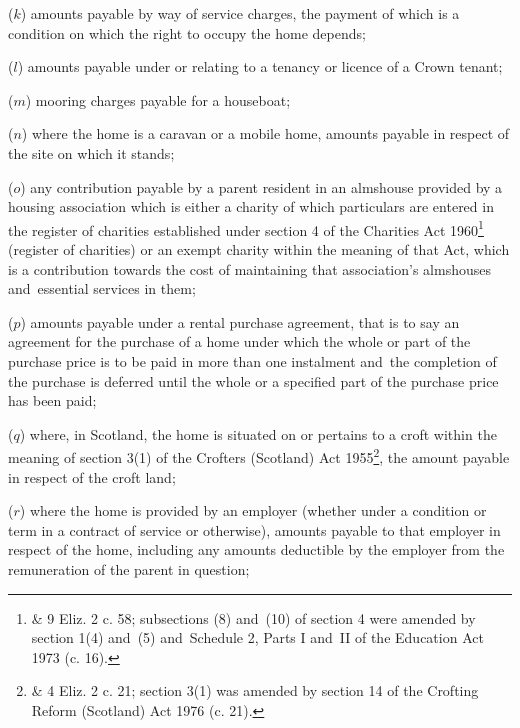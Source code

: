 \documentclass[12pt,a4paper]{article}
\begin{document}
\begin{enumerate}
($k$) 
amounts payable by way of  %
service charges, the payment of which is a condition on which the right to occupy the home depends;

($l$) 
amounts payable  %
under or relating to a tenancy or licence of a Crown tenant;

($m$) mooring charges payable for a houseboat;

($n$) where the home is a caravan or a mobile home, 
amounts payable  %
in respect of the site on which it stands;

($o$) any contribution payable by a parent resident in an almshouse provided by a housing association which is either a charity of which particulars are entered in the register of charities established under section 4 of the Charities Act 1960\footnote{ \& 9 Eliz. 2 c. 58; subsections (8) and~(10) of section 4 were amended by section 1(4) and~(5) and~Schedule 2, Parts I and~II of the Education Act 1973 (c. 16).} (register of charities) or an exempt charity within the meaning of that Act, which is a contribution towards the cost of maintaining that association’s almshouses and~essential services in them;

($p$) 
amounts payable  %
under a rental purchase agreement, that is to say an agreement for the purchase of a home under which the whole or part of the purchase price is to be paid in more than one instalment and~the completion of the purchase is deferred until the whole or a specified part of the purchase price has been paid;

($q$) where, in Scotland, the home is situated on or pertains to a croft within the meaning of section 3(1) of the Crofters (Scotland) Act 1955\footnote{ \& 4 Eliz. 2 c. 21; section 3(1) was amended by section 14 of the Crofting Reform (Scotland) Act 1976 (c. 21).}, the 
amount payable  %
in respect of the croft land;

($r$) where the home is provided by an employer (whether under a condition or term in a contract of service or otherwise), 
amounts payable  %
to that employer in respect of the home, including 
any amounts deductible by the employer  %
from the remuneration of the parent in question;


\end{enumerate}
\end{document}
